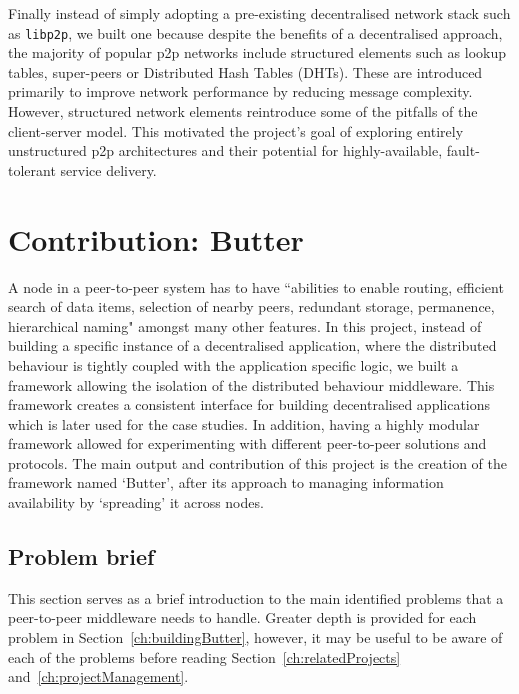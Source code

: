 Finally instead of simply adopting a pre-existing decentralised network stack such as \verb+libp2p+, we built one because despite the benefits of a decentralised approach, the majority of popular p2p networks include structured elements such as lookup tables, super-peers\cite{garbacki2007optimizing} or Distributed Hash Tables (DHTs). These are introduced primarily to improve network performance by reducing message complexity. However, structured network elements reintroduce some of the pitfalls of the client-server model. This motivated the project's goal of exploring entirely unstructured p2p architectures and their potential for highly-available, fault-tolerant service delivery.


\section{Contribution: Butter}
\label{sec:butterIntroduction}

A node in a peer-to-peer system has to have ``abilities to enable routing, efficient search of data items, selection of nearby peers, redundant storage, permanence, hierarchical naming"\cite{lua2005survey} amongst many other features. In this project, instead of building a specific instance of a decentralised application, where the distributed behaviour is tightly coupled with the application specific logic, we built a framework allowing the isolation of the distributed behaviour middleware. This framework creates a consistent interface for building decentralised applications which is later used for the case studies. In addition, having a highly modular framework allowed for experimenting with different peer-to-peer solutions and protocols. The main output and contribution of this project is the creation of the framework named `Butter', after its approach to managing information availability by `spreading' it across nodes.

\subsection{Problem brief}
\label{subsec:problemBrief}
This section serves as a brief introduction to the main identified problems that a peer-to-peer middleware needs to handle. Greater depth is provided for each problem in Section~\ref{ch:buildingButter}, however, it may be useful to be aware of each of the problems before reading Section~\ref{ch:relatedProjects} and~\ref{ch:projectManagement}.

